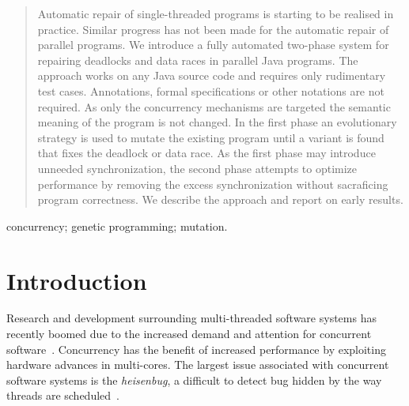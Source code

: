 \documentclass[10pt, conference, compsocconf]{IEEEtran}
\begin{document}
\begin{abstract}

Automatic repair of single-threaded programs is starting to be realised in practice.  Similar progress has not been made for the automatic repair of parallel programs.  We introduce a fully automated two-phase system for repairing deadlocks and data races in parallel Java programs. The approach works on any Java source code and requires only rudimentary test cases. Annotations, formal specifications or other notations are not required. As only the concurrency mechanisms are targeted the semantic meaning of the program is not changed. In the first phase an evolutionary strategy is used to mutate the existing program until a variant is found that  fixes the deadlock or data race. As the first phase may introduce unneeded synchronization, the second phase attempts to optimize performance by removing the excess synchronization without sacraficing program correctness. We describe the approach and report on early results.  

\end{abstract}

\begin{IEEEkeywords}
concurrency; genetic programming; mutation.

\end{IEEEkeywords}


%
\IEEEpeerreviewmaketitle



\section{Introduction}
\label{sec:introduction}

Research and development surrounding multi-threaded software systems has
recently boomed due to the increased demand and attention for concurrent
software~\cite{SL05}. Concurrency has the benefit of increased performance by
exploiting hardware advances in multi-cores. The largest issue associated with
concurrent software systems is the \textit{heisenbug}, a difficult to detect
bug hidden by the way threads are scheduled~\cite{MQB07}.
\end{document}
